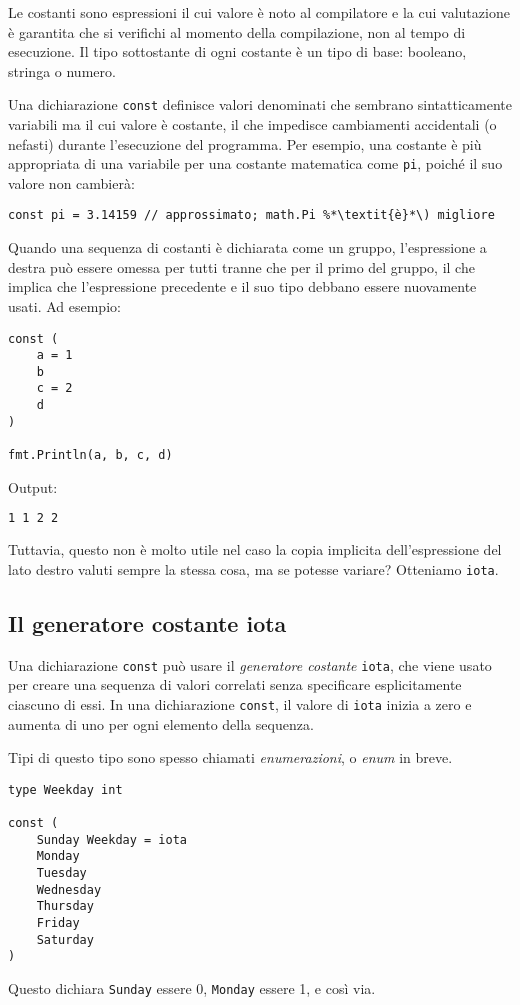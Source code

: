 Le costanti sono espressioni il cui valore è noto al compilatore e la cui valutazione è garantita che si verifichi al momento della compilazione, non al tempo di esecuzione.
Il tipo sottostante di ogni costante è un tipo di base: booleano, stringa o numero.

Una dichiarazione \verb|const| definisce valori denominati che sembrano sintatticamente variabili ma il cui valore è costante, il che impedisce cambiamenti accidentali (o nefasti) durante l'esecuzione del programma.
Per esempio, una costante è più appropriata di una variabile per una costante matematica come \verb|pi|, poiché il suo valore non cambierà:
\begin{lstlisting}[frame = single, label = {lst:lstlisting2-3.1}]
const pi = 3.14159 // approssimato; math.Pi %*\textit{è}*\) migliore
\end{lstlisting}
Quando una sequenza di costanti è dichiarata come un gruppo, l'espressione a destra può essere omessa per tutti tranne che per il primo del gruppo, il che implica che l'espressione precedente e il suo tipo debbano essere nuovamente usati.
Ad esempio:
\begin{lstlisting}[frame = single, label = {lst:lstlisting2-3.2}]
const (
    a = 1
    b
    c = 2
    d
)

fmt.Println(a, b, c, d)
\end{lstlisting}
Output:
\begin{lstlisting}[language = bash, frame = L, label = {lst:lstlisting2-3.3}]
1 1 2 2
\end{lstlisting}
Tuttavia, questo non è molto utile nel caso la copia implicita dell'espressione del lato destro valuti sempre la stessa cosa, ma se potesse variare?
Otteniamo \verb|iota|.

\subsection{Il generatore costante iota}
\label{subsec:il_generatore_costante_iota}%
Una dichiarazione \verb|const| può usare il \textit{generatore costante} \verb|iota|, che viene usato per creare una sequenza di valori correlati senza specificare esplicitamente ciascuno di essi.
In una dichiarazione \verb|const|, il valore di \verb|iota| inizia a zero e aumenta di uno per ogni elemento della sequenza.

Tipi di questo tipo sono spesso chiamati \textit{enumerazioni}, o \textit{enum} in breve.
\begin{lstlisting}[frame = single, label = {lst:lstlisting2-3-1.1}]
type Weekday int

const (
    Sunday Weekday = iota
    Monday
    Tuesday
    Wednesday
    Thursday
    Friday
    Saturday
)
\end{lstlisting}
Questo dichiara \verb|Sunday| essere 0, \verb|Monday| essere 1, e così via.

